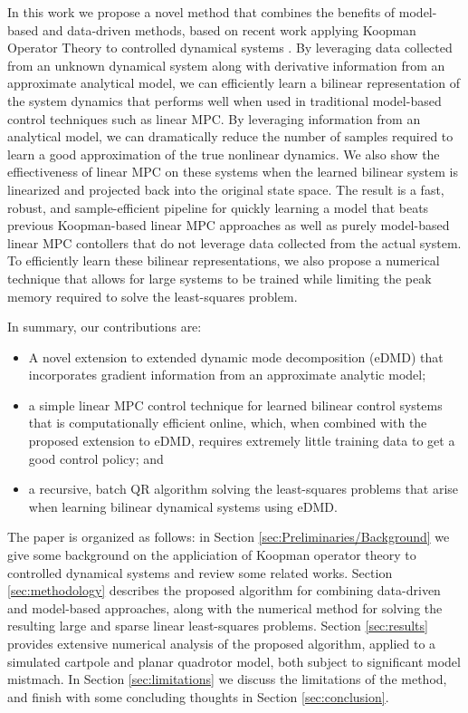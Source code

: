\documentclass{article}
\begin{document}
In this work we propose a novel method that combines the benefits of model-based and
data-driven methods, based on recent work  applying Koopman Operator Theory to
controlled dynamical systems 
\cite{Meduri2022,Bruder2021,Korda2018,Folkestad2020,Suh2020}.
By leveraging data collected from an
unknown dynamical system along with derivative information from an approximate
analytical model, we can efficiently learn a bilinear representation of the system
dynamics that performs well when used in traditional model-based control techniques such
as linear MPC. By leveraging information from an analytical model, we can dramatically
reduce the number of samples required to learn a good approximation of the true
nonlinear dynamics. We also show the effiectiveness of linear MPC on these systems 
when the learned bilinear system is linearized and projected back into the original 
state space. The result is a fast, robust, and sample-efficient pipeline for quickly 
learning a model that beats previous Koopman-based linear MPC approaches as well as 
purely model-based linear MPC contollers that do not leverage data collected from the 
actual system. To efficiently learn these bilinear representations, we also propose 
a numerical technique that allows for large systems to be trained while limiting the 
peak memory required to solve the least-squares problem.

In summary, our contributions are:
\begin{itemize}
  \item A novel extension to extended dynamic mode decomposition (eDMD) that
  incorporates gradient information from an approximate analytic model;
  
  \item a simple linear MPC control technique for learned bilinear control systems
  that is computationally efficient online, which, when combined with the proposed
  extension to eDMD, requires extremely little training data to get a good control
  policy; and
  
  \item a recursive, batch QR algorithm solving the least-squares problems that arise 
  when learning bilinear dynamical systems using eDMD.
\end{itemize}

The paper is organized as follows: in Section \ref{sec:Preliminaries/Background} we 
give some background on the appliciation of Koopman operator theory to controlled 
dynamical systems and review some related works. Section \ref{sec:methodology} describes
the proposed algorithm for combining data-driven and model-based approaches, along with 
the numerical method for solving the resulting large and sparse linear least-squares 
problems. Section \ref{sec:results} provides extensive numerical analysis of the 
proposed algorithm, applied to a simulated cartpole and planar quadrotor model, both 
subject to significant model mistmach. In Section \ref{sec:limitations} we discuss the 
limitations of the method, and finish with some concluding thoughts in Section 
\ref{sec:conclusion}.
\end{document}
